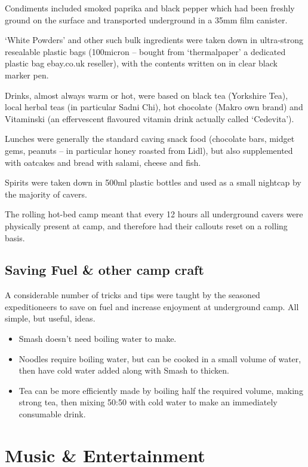 Condiments included smoked paprika and black pepper which had been freshly ground on the surface and transported underground in a 35mm film canister.

`White Powders' and other such bulk ingredients were taken down in ultra-strong resealable plastic bags (100micron -- bought from `thermalpaper' a dedicated plastic bag ebay.co.uk reseller), with the contents written on in clear black marker pen.

Drinks, almost always warm or hot, were based on black tea (Yorkshire Tea), local herbal teas (in particular Sadni Chi), hot chocolate (Makro own brand) and Vitaminski (an effervescent flavoured vitamin drink actually called `Cedevita').

Lunches were generally the standard caving snack food (chocolate bars, midget gems, peanuts -- in particular honey roasted from Lidl), but also supplemented with oatcakes and bread with salami, cheese and fish.

Spirits were taken down in 500ml plastic bottles and used as a small nightcap by the majority of cavers.

The rolling hot-bed camp meant that every 12 hours all underground cavers were physically present at camp, and therefore had their callouts reset on a rolling basis.


\subsection{Saving Fuel \& other camp
craft}

A considerable number of tricks and tips were taught by the seasoned expeditioneers to save on fuel and increase enjoyment at underground camp. All simple, but useful, ideas.

\begin{itemize}
\item
  Smash doesn't need boiling water to make.
\item
  Noodles require boiling water, but can be cooked in a small volume of
  water, then have cold water added along with Smash to thicken.
\item
  Tea can be more efficiently made by boiling half the required volume,
  making strong tea, then mixing 50:50 with cold water to make an
  immediately consumable drink.
\end{itemize}


\section{Music \& Entertainment}


